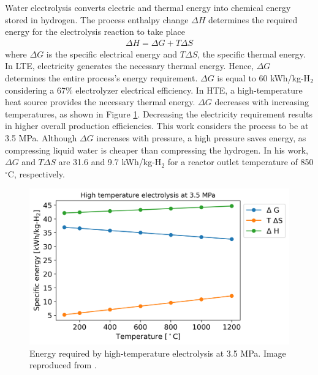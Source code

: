 \documentclass{anstrans}
\begin{document}
Water electrolysis converts electric and thermal energy into chemical energy stored in hydrogen.
The process enthalpy change $\Delta H$ determines the required energy for the electrolysis reaction to take place
\begin{align}
  \Delta H = \Delta G + T \Delta S
\end{align}
where $\Delta G$ is the specific electrical energy and $T \Delta S$, the specific thermal energy.
In LTE, electricity generates the necessary thermal energy.
Hence, $\Delta G$ determines the entire process’s energy requirement.
$\Delta G$ is equal to 60 kWh/kg-H$_2$ considering a 67\% electrolyzer electrical efficiency.
In HTE, a high-temperature heat source provides the necessary thermal energy.
$\Delta G$ decreases with increasing temperatures, as shown in Figure \ref{fig:hte-energy}.
Decreasing the electricity requirement results in higher overall production efficiencies.
This work considers the process to be at 3.5 MPa.
Although $\Delta G$ increases with pressure, a high pressure saves energy, as compressing liquid water is cheaper than compressing the hydrogen.
In his work, $\Delta G$ and $T \Delta S$ are 31.6 and 9.7 kWh/kg-H$_2$ for a reactor outlet temperature of 850 $^\circ$C, respectively.

\begin{figure}[htbp!] %
    \centering
    \includegraphics[width=0.90\linewidth]{figures/hte-energy-P}
    \hfill
    \caption{Energy required by high-temperature electrolysis at 3.5 MPa. Image reproduced from \cite{fairhurst-agosta_multi-physics_2020}.}
    \label{fig:hte-energy}
\end{figure}
\end{document}
